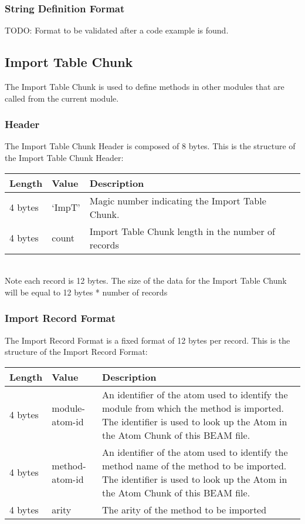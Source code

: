 \documentclass{article}
\begin{document}
\subsubsection{String Definition Format}

TODO: Format to be validated after a code example is found.

\subsection{Import Table Chunk}
The Import Table Chunk is used to define methods in other modules
that are called from the current module.

\subsubsection{Header}
The Import Table Chunk Header is composed of 8 bytes.
This is the structure of the Import Table Chunk Header:\\
\begin{tabular}{ |l|l|p{3in}| } \hline
Length  & Value  & Description\\ \hline
4 bytes & `ImpT' & Magic number indicating the Import Table Chunk.\\ \hline
4 bytes & count & Import Table Chunk length in the number of records \\ \hline
\end{tabular}\\

Note each record is 12 bytes.  The size of the data for the Import Table Chunk 
will be equal to 12 bytes * number of records

\subsubsection{Import Record Format}
The Import Record Format is a fixed format of 12 bytes per record.
This is the structure of the Import Record Format:\\
\begin{tabular}{ |l|l|p{3in}| } \hline
Length  & Value  & Description\\ \hline
4 bytes & module-atom-id & An identifier of the atom used to identify the module from which the method is imported.  The identifier is used to look up the Atom in the Atom Chunk of this BEAM file.\\ \hline
4 bytes & method-atom-id & An identifier of the atom used to identify the method name of the method to be imported.  The identifier is used to look up the Atom in the Atom Chunk of this BEAM file.\\ \hline
4 bytes & arity & The arity of the method to be imported\\ \hline
\end{tabular}\\
\end{document}
